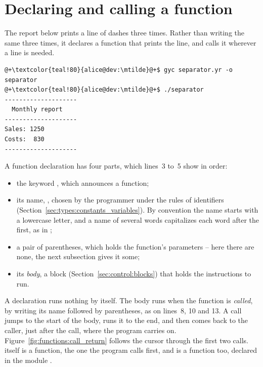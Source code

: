 \vfill\pagebreak
\section{Declaring and calling a function}
\label{sec:functions:declaring}

The report below prints a line of dashes three times. Rather than writing the
same  three times, it declares a function  that
prints the line, and calls it wherever a line is needed.


\vspace{-10pt}%
\begin{lstlisting}[style=bashVerb, escapechar=@+]
@+\textcolor{teal!80}{alice@dev:\mtilde}@+$ gyc separator.yr -o separator
@+\textcolor{teal!80}{alice@dev:\mtilde}@+$ ./separator
--------------------
  Monthly report
--------------------
Sales: 1250
Costs:  830
--------------------
\end{lstlisting}

A function declaration has four parts, which lines~3 to~5 show in order:

\begin{itemize}
\item the keyword , which announces a function;
\item its name, , chosen by the programmer under the rules of
  identifiers (Section~\ref{sec:types:constants_variables}). By convention the name
  starts with a lowercase letter, and a name of several words capitalizes each
  word after the first, as in ;
\item a pair of parentheses, which holds the function's parameters -- here there
  are none, the next subsection gives it some;
\item its \textit{body}, a block (Section~\ref{sec:control:blocks}) that holds
  the instructions to run.
\end{itemize}

A declaration runs nothing by itself. The body runs when the function is
\textit{called}, by writing its name followed by parentheses, as on lines~8,
10 and 13. A call jumps to the start of the body, runs it to the end, and then
comes back to the caller, just after the call, where the program carries on.
Figure~\ref{fig:functions:call_return} follows the cursor through the first two
calls.  itself is a function, the one the program calls first, and
 is a function too, declared in the module .

